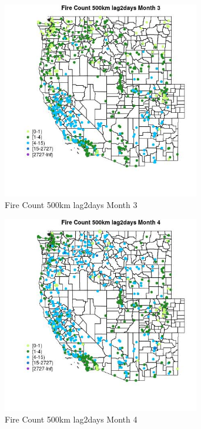\begin{figure} 
\centering  
\includegraphics[width=0.77\textwidth]{Code_Outputs/Report_ML_input_PM25_Step4_part_f_de_duplicated_aves_prioritize_24hr_obswNAs_MapObsMo3Fire_Count_500km_lag2days.jpg} 
\caption{\label{fig:Report_ML_input_PM25_Step4_part_f_de_duplicated_aves_prioritize_24hr_obswNAsMapObsMo3Fire_Count_500km_lag2days}Fire Count 500km lag2days Month 3} 
\end{figure} 
 

\begin{figure} 
\centering  
\includegraphics[width=0.77\textwidth]{Code_Outputs/Report_ML_input_PM25_Step4_part_f_de_duplicated_aves_prioritize_24hr_obswNAs_MapObsMo4Fire_Count_500km_lag2days.jpg} 
\caption{\label{fig:Report_ML_input_PM25_Step4_part_f_de_duplicated_aves_prioritize_24hr_obswNAsMapObsMo4Fire_Count_500km_lag2days}Fire Count 500km lag2days Month 4} 
\end{figure} 
 

